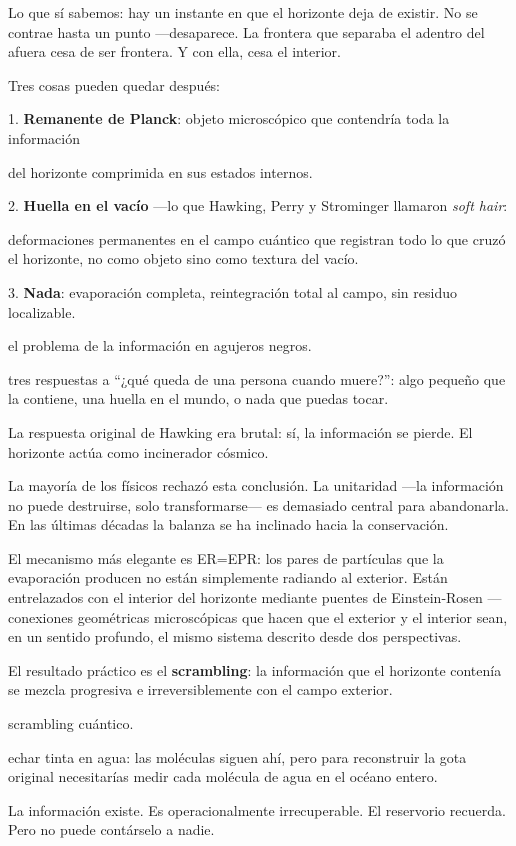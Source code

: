 Lo que sí sabemos: hay un instante en que el horizonte deja de existir. No se contrae hasta un punto —desaparece. La frontera que separaba el adentro del afuera cesa de ser frontera. Y con ella, cesa el interior.

Tres cosas pueden quedar después:

1. \textbf{Remanente de Planck}: objeto microscópico que contendría toda la información

del horizonte comprimida en sus estados internos.

2. \textbf{Huella en el vacío} —lo que Hawking, Perry y Strominger llamaron \emph{soft hair}:

deformaciones permanentes en el campo cuántico que registran todo lo que cruzó el horizonte, no como objeto sino como textura del vacío.

3. \textbf{Nada}: evaporación completa, reintegración total al campo, sin residuo localizable.

\begin{fisica}
 el problema de la información en agujeros negros.

 tres respuestas a “¿qué queda de una persona cuando muere?”: algo pequeño que la contiene, una huella en el mundo, o nada que puedas tocar.
\end{fisica}
\noindent La respuesta original de Hawking era brutal: sí, la información se pierde. El horizonte actúa como incinerador cósmico.

La mayoría de los físicos rechazó esta conclusión. La unitaridad —la información no puede destruirse, solo transformarse— es demasiado central para abandonarla. En las últimas décadas la balanza se ha inclinado hacia la conservación.

El mecanismo más elegante es ER=EPR: los pares de partículas que la evaporación producen no están simplemente radiando al exterior. Están entrelazados con el interior del horizonte mediante puentes de Einstein-Rosen —conexiones geométricas microscópicas que hacen que el exterior y el interior sean, en un sentido profundo, el mismo sistema descrito desde dos perspectivas.

El resultado práctico es el \textbf{scrambling}: la información que el horizonte contenía se mezcla progresiva e irreversiblemente con el campo exterior.

\begin{fisica}
 scrambling cuántico.

 echar tinta en agua: las moléculas siguen ahí, pero para reconstruir la gota original necesitarías medir cada molécula de agua en el océano entero.
\end{fisica}
La información existe. Es operacionalmente irrecuperable. El reservorio recuerda. Pero no puede contárselo a nadie.

